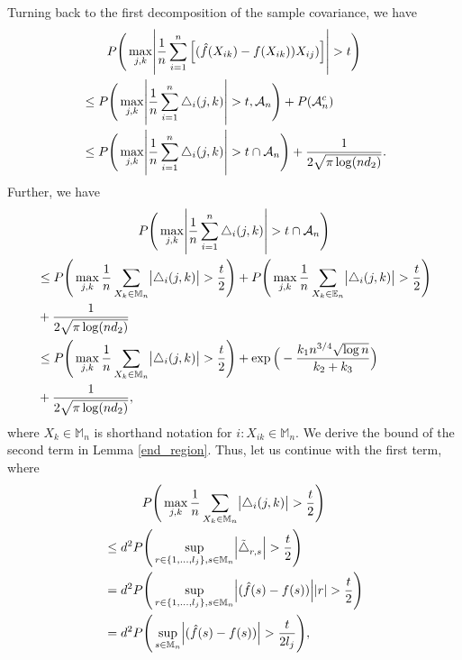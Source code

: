 Turning back to the first decomposition of the sample covariance, we have
\begin{multline*}
    P\Bigg(\max_{j,k}\abs{\frac{1}{n}\sum_{i=1}^n \Big[(\hat{f}(X_{ik}) - f(X_{ik}))X_{ij})\Big]} > t \Bigg) \\
    \begin{aligned}
         & \leq P\Bigg(\max_{j,k}\abs{\frac{1}{n}\sum_{i=1}^n \bigtriangleup_i(j,k)} > t, \mathcal{A}_n \Bigg) + P(\mathcal{A}_n^c)                   \\
         & \leq P\Bigg(\max_{j,k}\abs{\frac{1}{n}\sum_{i=1}^n \bigtriangleup_i(j,k)} > t \cap \mathcal{A}_n\Bigg) + \frac{1}{2\sqrt{\pi \log(nd_2)}}.
    \end{aligned}
\end{multline*}
Further, we have
\begin{multline*}
    P\Bigg(\max_{j,k}\abs{\frac{1}{n}\sum_{i=1}^n \bigtriangleup_i(j,k)} > t \cap \mathcal{A}_n\Bigg) \\
    \begin{aligned}
         & \leq P\Bigg(\max_{j,k} \frac{1}{n} \sum_{X_k \in \mathbb{M}_n} \abs{\bigtriangleup_i(j,k)} > \frac{t}{2}\Bigg) + P\Bigg(\max_{j,k} \frac{1}{n} \sum_{X_k \in \mathbb{E}_n} \abs{\bigtriangleup_i(j,k)} > \frac{t}{2}\Bigg) \\
         & + \frac{1}{2\sqrt{\pi \log(nd_2)}}                                                                                                                                                                                         \\
         & \leq P\Bigg(\max_{j,k} \frac{1}{n} \sum_{X_k \in \mathbb{M}_n} \abs{\bigtriangleup_i(j,k)} > \frac{t}{2}\Bigg) + \exp\Big(- \frac{k_1 n^{3/4} \sqrt{\log n}}{k_2+ k_3} \Big)                                               \\
         & + \frac{1}{2\sqrt{\pi \log(nd_2)}},
    \end{aligned}
\end{multline*}
where $X_k \in \mathbb{M}_n$ is shorthand notation for $i:X_{ik} \in \mathbb{M}_n$. We derive the bound of the second term in Lemma \ref{end_region}. Thus, let us continue with the first term, where
\begin{multline*}
    P\Bigg(\max_{j,k} \frac{1}{n} \sum_{X_k \in \mathbb{M}_n} \abs{\bigtriangleup_i(j,k)} > \frac{t}{2}\Bigg) \\
    \begin{aligned}
         & \leq d^2P\Bigg(\sup_{r \in \{1,\dots, l_{j}\},s \in \mathbb{M}_n} \abs{\tilde{\bigtriangleup}_{r,s}} > \frac{t}{2}\Bigg) \\
         & = d^2P\Bigg(\sup_{r \in \{1,\dots, l_{j}\},s \in \mathbb{M}_n} \abs{(\hat{f}(s) - f(s))}\abs{r} > \frac{t}{2}\Bigg)      \\
         & = d^2P\Bigg(\sup_{s \in \mathbb{M}_n} \abs{(\hat{f}(s) - f(s))} > \frac{t}{2l_{j}}\Bigg),
    \end{aligned}
\end{multline*}
